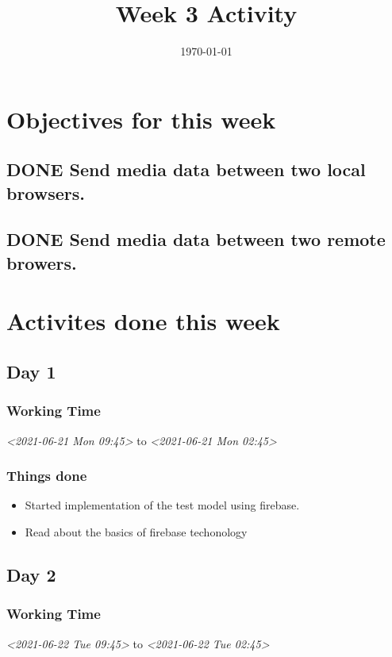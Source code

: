 \documentclass[11pt]{article}
\date{\today}
\title{Week 3 Activity}
\begin{document}
\maketitle
\section*{Objectives for this week}
\label{sec:org077b7fd}
\subsection*{{\bfseries\sffamily DONE} Send media data between two local browsers.}
\label{sec:org4614bd5}
\subsection*{{\bfseries\sffamily DONE} Send media data between two remote browers.}
\label{sec:orgee92cb6}
\section*{Activites done this week}
\label{sec:org0304106}
\subsection*{Day 1}
\label{sec:orgc3432d8}
\subsubsection*{Working Time}
\label{sec:orgdc776f6}
\textit{<2021-06-21 Mon 09:45> } to \textit{<2021-06-21 Mon 02:45>}

\subsubsection*{Things done}
\label{sec:orgb9d0d8c}
\begin{itemize}
\item Started implementation of the test model using firebase.
\item Read about the basics of firebase techonology
\end{itemize}

\subsection*{Day 2}
\label{sec:org124c33a}

\subsubsection*{Working Time}
\label{sec:org03f57cb}
\textit{<2021-06-22 Tue 09:45> } to \textit{<2021-06-22 Tue 02:45>}
\end{document}
